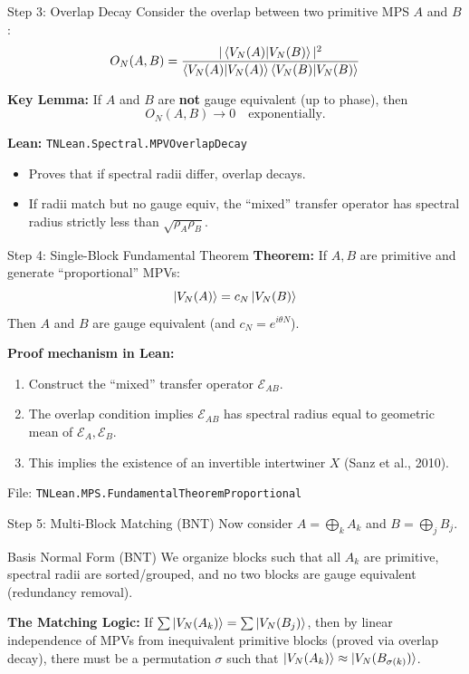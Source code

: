 \documentclass[aspectratio=169,10pt]{beamer}
\begin{document}
\begin{frame}{Step 3: Overlap Decay}
    Consider the overlap between two primitive MPS $A$ and $B$:
    \[
        O_N(A,B) = \frac{|\braket{V_N(A) | V_N(B)}|^2}{\braket{V_N(A)|V_N(A)}\braket{V_N(B)|V_N(B)}}
    \]

    \textbf{Key Lemma:}
    If $A$ and $B$ are \textbf{not} gauge equivalent (up to phase), then
    \[ O_N(A,B) \to 0 \quad \text{exponentially}. \]
    
    \textbf{Lean:} \texttt{TNLean.Spectral.MPVOverlapDecay}
    \begin{itemize}
        \item Proves that if spectral radii differ, overlap decays.
        \item If radii match but no gauge equiv, the ``mixed'' transfer operator has spectral radius strictly less than $\sqrt{\rho_A \rho_B}$.
    \end{itemize}
\end{frame}

\begin{frame}{Step 4: Single-Block Fundamental Theorem}
    \textbf{Theorem:}
    If $A, B$ are primitive and generate ``proportional'' MPVs:
    \[ \ket{V_N(A)} = c_N \ket{V_N(B)} \]
    Then $A$ and $B$ are gauge equivalent (and $c_N = e^{i\theta N}$).

    \vspace{1em}
    \textbf{Proof mechanism in Lean:}
    \begin{enumerate}
        \item Construct the ``mixed'' transfer operator $\mathcal{E}_{AB}$.
        \item The overlap condition implies $\mathcal{E}_{AB}$ has spectral radius equal to geometric mean of $\mathcal{E}_A, \mathcal{E}_B$.
        \item This implies the existence of an invertible intertwiner $X$ (Sanz et al., 2010).
    \end{enumerate}
    
    File: \texttt{TNLean.MPS.FundamentalTheoremProportional}
\end{frame}

\begin{frame}{Step 5: Multi-Block Matching (BNT)}
    \small
    Now consider $A = \bigoplus_k A_k$ and $B = \bigoplus_j B_j$.
    
    \begin{block}{Basis Normal Form (BNT)}
        We organize blocks such that all $A_k$ are primitive,
        spectral radii are sorted/grouped, and no two blocks are gauge equivalent
        (redundancy removal).
    \end{block}

    \textbf{The Matching Logic:}
    If $\sum \ket{V_N(A_k)} = \sum \ket{V_N(B_j)}$, then by linear independence of MPVs from inequivalent primitive blocks (proved via overlap decay), there must be a permutation $\sigma$ such that $\ket{V_N(A_k)} \approx \ket{V_N(B_{\sigma(k)})}$.
\end{frame}
\end{document}

